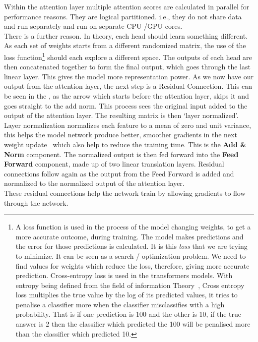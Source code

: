 Within the attention layer multiple attention scores are calculated in parallel for performance reasons. They are logical
partitioned. i.e., they do not share data and run separately and run on separate CPU /GPU cores.\\
There is a further reason. In theory, each head should learn something different. As each set of weights starts from a different
randomized matrix, the use of the loss function\footnote{A loss function is used in the process of the model changing weights, to get
	a more accurate outcome, during training. The model makes predictions and the error for those predictions is calculated. It is this
	\emph{loss} that we are trying to minimize. It can be seen as a search / optimization problem. We need to find values for weights
	which reduce the loss, therefore, giving more accurate prediction.
	\bigbreak
	Cross-entropy loss is used in the
	transformers models. With entropy being defined from the field of information Theory~\autocite{brownleeGentleIntroductionCrossEntropy2019},
	Cross entropy loss multiplies the true value by the log of its predicted values, it tries to penalise a classifier more
	when the classifier misclassifies with a high probability. That is if one prediction is 100 and the other is 10, if
	the true answer is 2 then the classifier which predicted the 100 will be penalised more than the classifier
	which predicted 10.}
should each explore a different space. The outputs of each head are then concatenated together to form
the final output, which goes through the last linear layer. This gives the model more representation power.
\bigbreak
As we now have our output from the attention layer, the next step is a Residual Connection. This can be seen in the
, as the arrow which starts before the attention layer, skips it and goes straight to the add norm.
This process sees the original input added to the output of the attention layer.
The resulting matrix is then `layer normalized'. Layer normalization normalizes each feature to a mean of zero and unit variance,
this helps the model network produce better, smoother gradients in the next weight
update~\autocite{vijayraniaDifferentNormalizationLayers2021} which also help to reduce the training time.
This is the \textbf{Add \& Norm} component.
\bigbreak
The normalized output is then fed forward into the \textbf{Feed Forward} component, made up of two linear translation layers.
Residual connections follow again as the output from the Feed Forward is added and normalized to the normalized output of the
attention layer.\\
These residual connections help the network train by allowing gradients to flow through the network.


